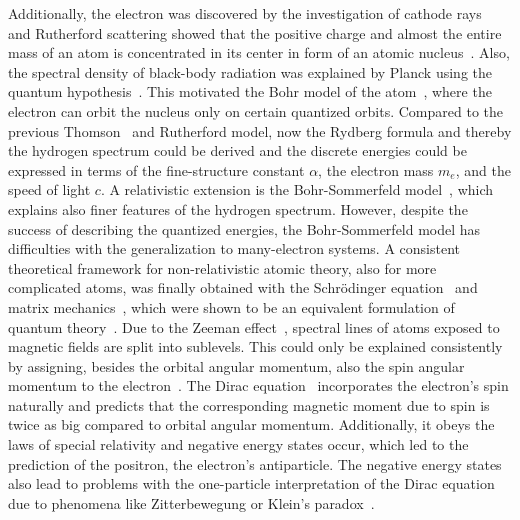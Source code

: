 Additionally, the electron was discovered by the investigation of cathode rays~\cite{thomson1897,rechenberg1997} and Rutherford scattering showed that the positive charge and almost the entire mass of an atom is concentrated in its center in form of an atomic nucleus~\cite{rutherford1911}. Also, the spectral density of black-body radiation was explained by Planck using the quantum hypothesis~\cite{planck1978}. This motivated the Bohr model of the atom~\cite{bohr1913}, where the electron can orbit the nucleus only on certain quantized orbits. Compared to the previous Thomson~\cite{thomson1904} and Rutherford model, now the Rydberg formula and thereby the hydrogen spectrum could be derived and the discrete energies could be expressed in terms of the fine-structure constant $\alpha$, the electron mass $m_e$, and the speed of light $c$. A relativistic extension is the Bohr-Sommerfeld model~\cite{sommerfeld1916}, which explains also finer features of the hydrogen spectrum.
However, despite the success of describing the quantized energies, the Bohr-Sommerfeld model has difficulties with the generalization to many-electron systems. A consistent theoretical framework for non-relativistic atomic theory, also for more complicated atoms, was finally obtained with the Schrödinger equation~\cite{schrodinger1926_1,schrodinger1926_2,schrodinger1926_3,schrodinger1926_4} and matrix mechanics~\cite{heisenberg1925,born1925,born1926}, which were shown to be an equivalent formulation of quantum theory~\cite{schrodinger1926_5}.
Due to the Zeeman effect~\cite{zeeman1896}, spectral lines of atoms exposed to magnetic fields are split into sublevels. This could only be explained consistently by assigning, besides the orbital angular momentum, also the spin angular momentum to the electron~\cite{uhlenbeck1925}. The Dirac equation~\cite{dirac1928} incorporates the electron's spin naturally and predicts that the corresponding magnetic moment due to spin is twice as big compared to orbital angular momentum. Additionally, it obeys the laws of special relativity and negative energy states occur, which led to the prediction of the positron, the electron's antiparticle. The negative energy states also lead to problems with the one-particle interpretation of the Dirac equation due to phenomena like Zitterbewegung or Klein's paradox~\cite{the_dirac_eq}.
 
